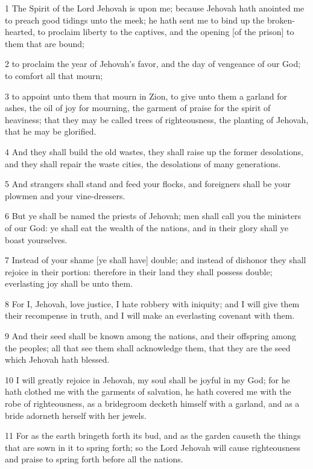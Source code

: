 \par 1 The Spirit of the Lord Jehovah is upon me; because Jehovah hath anointed me to preach good tidings unto the meek; he hath sent me to bind up the broken-hearted, to proclaim liberty to the captives, and the opening [of the prison] to them that are bound;
\par 2 to proclaim the year of Jehovah's favor, and the day of vengeance of our God; to comfort all that mourn;
\par 3 to appoint unto them that mourn in Zion, to give unto them a garland for ashes, the oil of joy for mourning, the garment of praise for the spirit of heaviness; that they may be called trees of righteousness, the planting of Jehovah, that he may be glorified.
\par 4 And they shall build the old wastes, they shall raise up the former desolations, and they shall repair the waste cities, the desolations of many generations.
\par 5 And strangers shall stand and feed your flocks, and foreigners shall be your plowmen and your vine-dressers.
\par 6 But ye shall be named the priests of Jehovah; men shall call you the ministers of our God: ye shall eat the wealth of the nations, and in their glory shall ye boast yourselves.
\par 7 Instead of your shame [ye shall have] double; and instead of dishonor they shall rejoice in their portion: therefore in their land they shall possess double; everlasting joy shall be unto them.
\par 8 For I, Jehovah, love justice, I hate robbery with iniquity; and I will give them their recompense in truth, and I will make an everlasting covenant with them.
\par 9 And their seed shall be known among the nations, and their offspring among the peoples; all that see them shall acknowledge them, that they are the seed which Jehovah hath blessed.
\par 10 I will greatly rejoice in Jehovah, my soul shall be joyful in my God; for he hath clothed me with the garments of salvation, he hath covered me with the robe of righteousness, as a bridegroom decketh himself with a garland, and as a bride adorneth herself with her jewels.
\par 11 For as the earth bringeth forth its bud, and as the garden causeth the things that are sown in it to spring forth; so the Lord Jehovah will cause righteousness and praise to spring forth before all the nations.

